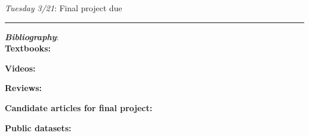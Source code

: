 \documentclass[12pt]{article}
\begin{document}
\emph{Tuesday 3/21}: Final project due

\begin{center}
	\rule{\textwidth}{0.5pt}
\end{center}

\noindent\textbf{\emph{Bibliography}}:\\

\textbf{Textbooks:}

\newrefsection
\nocite{Mehta:2019,Abu-Mostafa:2012,Erdman:2021,Zeljko:2014,Calafiura:2022,Chollet:2021}
\printbibliography[heading=none]

\textbf{Videos:}

\newrefsection
\nocite{3blue1brown_neuralnetwork,3blue1brown_gradientdescent}
\printbibliography[heading=none]

\textbf{Reviews:}

\newrefsection
\nocite{Carleo:2019ptp,hepmllivingreview}
\printbibliography[heading=none]

\textbf{Candidate articles for final project:}

\newrefsection
\nocite{deOliveira:2015xxd,Aurisano:2016jvx,Komiske:2016rsd,Khan:2018opv,Zhou:2019,Moreno:2019neq,Ormiston:2020ele,Moreno:2021fvp,Erdmann:2019nie,Guest:2016iqz}
\printbibliography[heading=none]

\textbf{Public datasets:}

\newrefsection
\nocite{kasieczka_gregor_2019_2603256,hbb_dataset,galaxy-zoo-the-galaxy-challenge,g2net-gravitational-wave-detection,trackml-particle-identification}
\printbibliography[heading=none]
\end{document}

